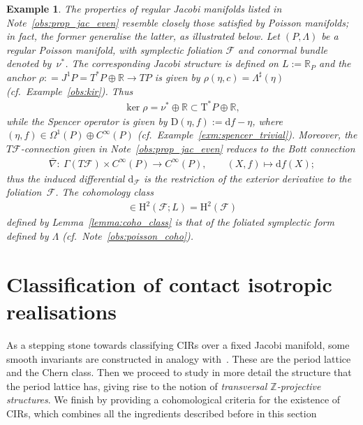 \documentclass[10pt,a4paper]{amsart}
\numberwithin{equation}{section}
\newtheorem{Example}[Theorem]{Example}
\newcommand{\de}{\mathrm{d}} %
\newcommand{\PM}{(P,\Lambda)} %
\newcommand{\cotan}{\mathrm{T}^*} %
\newcommand{\HH}{\mathrm{H}}
\newcommand{\RR}{\mathbb{R}}
\newcommand{\ZZ}{\mathbb{Z}}
\begin{document}
\begin{Example}\label{exm:Poisson_case}
The properties of regular Jacobi manifolds listed in Note~\ref{obs:prop_jac_even} resemble closely those satisf\/ied by Poisson manifolds; in fact, the former generalise the latter, as illustrated below. Let $\PM$ be a regular Poisson manifold, with symplectic foliation $\mathcal{F}$ and conormal bundle denoted by~$\nu^*$. The corresponding Jacobi structure is def\/ined on $L := \RR_{P}$ and the anchor $ \rho: =J^1P=T^*P\oplus \RR \to TP$ is given by $\rho(\eta, c) = \Lambda^{\sharp}(\eta)$ (cf.\ Example~\ref{obs:kir}). Thus
 \begin{gather*}
 \ker \rho = \nu^* \oplus \RR \subset \cotan P \oplus \RR,
 \end{gather*}
while the Spencer operator is given by $ \mathrm{D}(\eta,f) := \de f - \eta$, where $(\eta,f) \in \Omega^1(P) \oplus C^{\infty}(P)$ (cf.\ Example~\ref{exm:spencer_trivial}). Moreover, the $T\mathcal{F}$-connection given in Note~\ref{obs:prop_jac_even} reduces to the Bott connection
 \begin{gather*}
 \bar{\nabla} \colon \ \Gamma(T\mathcal{F}) \times C^{\infty}(P) \to
 C^{\infty}(P), \qquad (X,f) \mapsto \de f(X);
 \end{gather*}
thus the induced dif\/ferential $\de_{\mathcal{F}}$ is the restriction of the exterior derivative to the foliation~$\mathcal{F}$. The cohomology class
 \begin{gather*}
 [\omega_{\mathcal{F}}] \in \HH^2(\mathcal{F};L) = \HH^2(\mathcal{F})
\end{gather*}
def\/ined by Lemma~\ref{lemma:coho_class} is that of the foliated symplectic form def\/ined by $\Lambda$ (cf.\ Note~\ref{obs:poisson_coho}).
\end{Example}

\section{Classif\/ication of contact isotropic realisations}\label{sec:smooth-invar-cirs}
As a stepping stone towards classifying CIRs over a f\/ixed Jacobi manifold, some smooth invariants are constructed in analogy with~\cite{dd}. These are the period lattice and the Chern class. Then we proceed to study in more detail the structure that the period lattice has, giving rise to the notion of {\it transversal $\ZZ$-projective structures}. We f\/inish by providing a cohomological criteria for the existence of CIRs, which combines all the ingredients described before in this section
\end{document}
